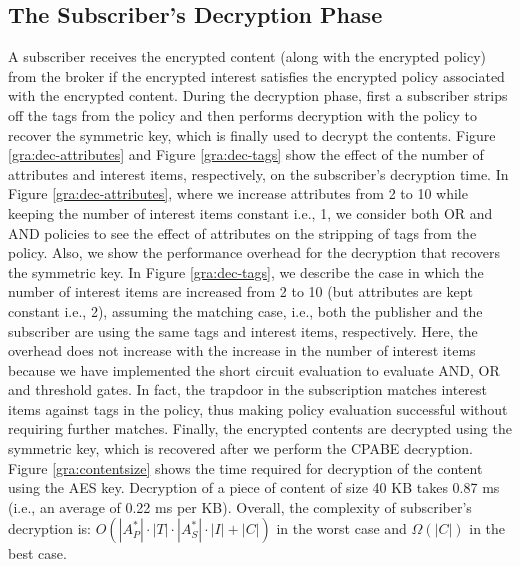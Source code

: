 \documentclass[epsfig,a4paper,11pt,titlepage]{book}
\numberwithin{algorithm}{chapter}
\begin{document}
\subsection{The Subscriber's Decryption Phase}
A subscriber receives the encrypted content (along with the encrypted policy) from the broker if the encrypted interest satisfies the encrypted policy associated with the encrypted content. During the decryption phase, first a subscriber strips off the tags from the policy and then performs decryption with the policy to recover the symmetric key, which is finally used to decrypt the contents. Figure \ref{gra:dec-attributes} and Figure \ref{gra:dec-tags} show the effect of the number of attributes and interest items, respectively, on the subscriber's decryption time. In Figure \ref{gra:dec-attributes}, where we increase attributes from 2 to 10 while keeping the number of interest items constant i.e., 1, we consider both OR and AND policies to see the effect of attributes on the stripping of tags from the policy. Also, we show the performance overhead for the decryption that recovers the symmetric key. In Figure \ref{gra:dec-tags}, we describe the case in which the number of interest items are increased from 2 to 10 (but attributes are kept constant i.e., 2), assuming the matching case, i.e., both the publisher and the subscriber are using the same tags and interest items, respectively. Here, the overhead does not increase with the increase in the number of interest items because we have implemented the short circuit evaluation to evaluate AND, OR and threshold gates. In fact, the trapdoor in the subscription matches interest items against tags in the policy, thus making policy evaluation successful without requiring further matches. Finally, the encrypted contents are decrypted using the symmetric key, which is recovered after we perform the \gls{CPABE} decryption. Figure \ref{gra:contentsize} shows the time required for decryption of the content using the \gls{AES} key. Decryption of a piece of content of size 40 \gls{KB} takes 0.87 \gls{ms} (i.e., an average of 0.22 \gls{ms} per \gls{KB}). Overall, the complexity of subscriber's decryption is: $O(|A_P^*| \cdot |T| \cdot |A_S^*| \cdot |I| + |C|)$ in the worst case and ${\Omega}(|C|)$ in the best case.
\end{document}

